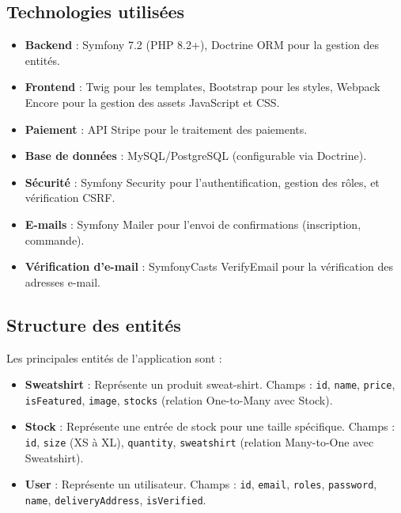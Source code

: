 \documentclass[a4paper,11pt]{article}
\begin{document}
\subsection{Technologies utilisées}
\begin{itemize}
    \item \textbf{Backend} : Symfony 7.2 (PHP 8.2+), Doctrine ORM pour la gestion des entités.
    \item \textbf{Frontend} : Twig pour les templates, Bootstrap pour les styles, Webpack Encore pour la gestion des assets JavaScript et CSS.
    \item \textbf{Paiement} : API Stripe pour le traitement des paiements.
    \item \textbf{Base de données} : MySQL/PostgreSQL (configurable via Doctrine).
    \item \textbf{Sécurité} : Symfony Security pour l'authentification, gestion des rôles, et vérification CSRF.
    \item \textbf{E-mails} : Symfony Mailer pour l'envoi de confirmations (inscription, commande).
    \item \textbf{Vérification d'e-mail} : SymfonyCasts VerifyEmail pour la vérification des adresses e-mail.
\end{itemize}

\subsection{Structure des entités}
Les principales entités de l'application sont :
\begin{itemize}
    \item \textbf{Sweatshirt} : Représente un produit sweat-shirt. Champs : \texttt{id}, \texttt{name}, \texttt{price}, \texttt{isFeatured}, \texttt{image}, \texttt{stocks} (relation One-to-Many avec Stock).
    \item \textbf{Stock} : Représente une entrée de stock pour une taille spécifique. Champs : \texttt{id}, \texttt{size} (XS à XL), \texttt{quantity}, \texttt{sweatshirt} (relation Many-to-One avec Sweatshirt).
    \item \textbf{User} : Représente un utilisateur. Champs : \texttt{id}, \texttt{email}, \texttt{roles}, \texttt{password}, \texttt{name}, \texttt{deliveryAddress}, \texttt{isVerified}.
\end{itemize}
\end{document}
